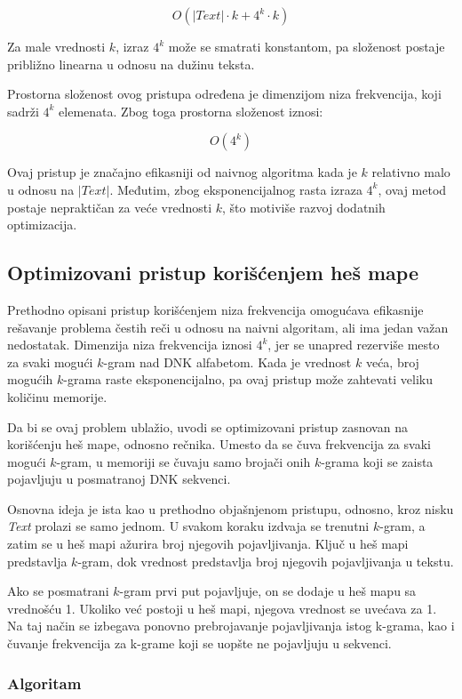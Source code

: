 \documentclass[12pt,oneside]{memoir}
\begin{document}
\[
O(|Text| \cdot k + 4^k \cdot k)
\]

Za male vrednosti $k$, izraz $4^k$ može se smatrati konstantom, pa složenost postaje približno linearna u odnosu na dužinu teksta.

Prostorna složenost ovog pristupa određena je dimenzijom niza frekvencija, koji sadrži $4^k$ elemenata. Zbog toga prostorna složenost iznosi:

\[
O(4^k)
\]

Ovaj pristup je značajno efikasniji od naivnog algoritma kada je $k$ relativno malo u odnosu na $|Text|$. Međutim, zbog eksponencijalnog rasta izraza $4^k$, ovaj metod postaje nepraktičan za veće vrednosti $k$, što motiviše razvoj dodatnih optimizacija.

\subsection{Optimizovani pristup korišćenjem heš mape}

Prethodno opisani pristup korišćenjem niza frekvencija omogućava efikasnije rešavanje problema čestih reči u odnosu na naivni algoritam, ali ima jedan važan nedostatak. Dimenzija niza frekvencija iznosi $4^k$, jer se unapred rezerviše mesto za svaki mogući $k$-gram nad DNK alfabetom. Kada je vrednost $k$ veća, broj mogućih $k$-grama raste eksponencijalno, pa ovaj pristup može zahtevati veliku količinu memorije.

Da bi se ovaj problem ublažio, uvodi se optimizovani pristup zasnovan na korišćenju heš mape, odnosno rečnika. Umesto da se čuva frekvencija za svaki mogući $k$-gram, u memoriji se čuvaju samo brojači onih $k$-grama koji se zaista pojavljuju u posmatranoj DNK sekvenci.

Osnovna ideja je ista kao u prethodno objašnjenom pristupu, odnosno, kroz nisku \textit{Text} prolazi se samo jednom. U svakom koraku izdvaja se trenutni $k$-gram, a zatim se u heš mapi ažurira broj njegovih pojavljivanja. Ključ u heš mapi predstavlja $k$-gram, dok vrednost predstavlja broj njegovih pojavljivanja u tekstu.

Ako se posmatrani $k$-gram prvi put pojavljuje, on se dodaje u heš mapu sa vrednošću 1. Ukoliko već postoji u heš mapi, njegova vrednost se uvećava za 1. Na taj način se izbegava ponovno prebrojavanje pojavljivanja istog k-grama, kao i čuvanje frekvencija za k-grame koji se uopšte ne pojavljuju u sekvenci.

\subsubsection{Algoritam}
\end{document}
